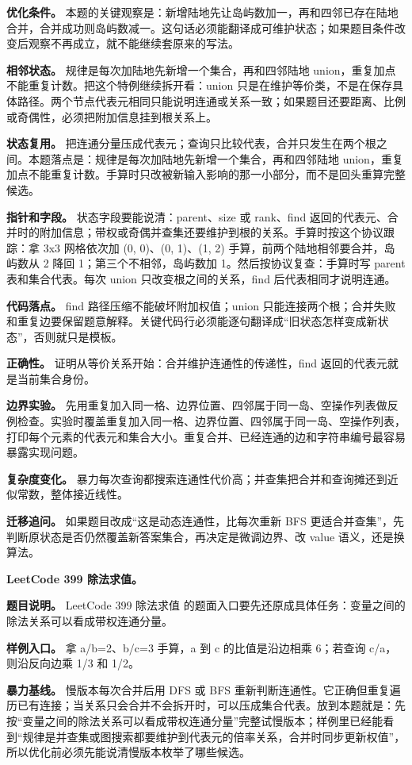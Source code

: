 \textbf{优化条件。} 本题的关键观察是：新增陆地先让岛屿数加一，再和四邻已存在陆地合并，合并成功则岛屿数减一。这句话必须能翻译成可维护状态；如果题目条件改变后观察不再成立，就不能继续套原来的写法。

\textbf{相邻状态。} 规律是每次加陆地先新增一个集合，再和四邻陆地 union，重复加点不能重复计数。把这个特例继续拆开看：union 只是在维护等价类，不是在保存具体路径。两个节点代表元相同只能说明连通或关系一致；如果题目还要距离、比例或奇偶性，必须把附加信息挂到根关系上。

\textbf{状态复用。} 把连通分量压成代表元；查询只比较代表，合并只发生在两个根之间。本题落点是：规律是每次加陆地先新增一个集合，再和四邻陆地 union，重复加点不能重复计数。手算时只改被新输入影响的那一小部分，而不是回头重算完整候选。

\textbf{指针和字段。} 状态字段要能说清：parent、size 或 rank、find 返回的代表元、合并时的附加信息；带权或奇偶并查集还要维护到根的关系。手算时按这个协议跟踪：拿 3x3 网格依次加 (0, 0)、(0, 1)、(1, 2) 手算，前两个陆地相邻要合并，岛屿数从 2 降回 1；第三个不相邻，岛屿数加 1。然后按协议复查：手算时写 parent 表和集合代表。每次 union 只改变根之间的关系，find 后代表相同才说明连通。

\textbf{代码落点。} find 路径压缩不能破坏附加权值；union 只能连接两个根；合并失败和重复边要保留题意解释。关键代码行必须能逐句翻译成“旧状态怎样变成新状态”，否则就只是模板。

\textbf{正确性。} 证明从等价关系开始：合并维护连通性的传递性，find 返回的代表元就是当前集合身份。

\textbf{边界实验。} 先用重复加入同一格、边界位置、四邻属于同一岛、空操作列表做反例检查。实验时覆盖重复加入同一格、边界位置、四邻属于同一岛、空操作列表，打印每个元素的代表元和集合大小。重复合并、已经连通的边和字符串编号最容易暴露实现问题。

\textbf{复杂度变化。} 暴力每次查询都搜索连通性代价高；并查集把合并和查询摊还到近似常数，整体接近线性。

\textbf{迁移追问。} 如果题目改成“这是动态连通性，比每次重新 BFS 更适合并查集”，先判断原状态是否仍然覆盖新答案集合，再决定是微调边界、改 value 语义，还是换算法。

\noindent\textbf{LeetCode 399 除法求值。}

\textbf{题目说明。} LeetCode 399 除法求值 的题面入口要先还原成具体任务：变量之间的除法关系可以看成带权连通分量。

\textbf{样例入口。} 拿 a/b=2、b/c=3 手算，a 到 c 的比值是沿边相乘 6；若查询 c/a，则沿反向边乘 1/3 和 1/2。

\textbf{暴力基线。} 慢版本每次合并后用 DFS 或 BFS 重新判断连通性。它正确但重复遍历已有连接；当关系只会合并不会拆开时，可以压成集合代表。放到本题就是：先按“变量之间的除法关系可以看成带权连通分量”完整试慢版本；样例里已经能看到“规律是并查集或图搜索都要维护到代表元的倍率关系，合并时同步更新权值”，所以优化前必须先能说清慢版本枚举了哪些候选。

